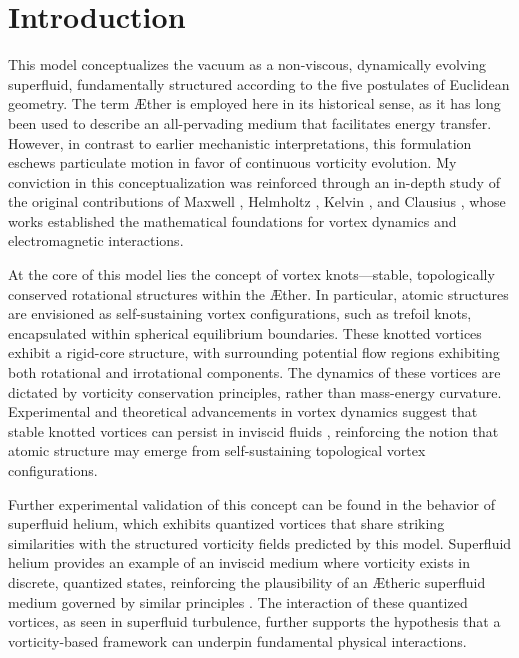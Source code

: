 \documentclass[a4paper,10pt]{article}
\begin{document}
    \section{Introduction}
    This model conceptualizes the vacuum as a non-viscous, dynamically evolving superfluid, fundamentally structured according to the five postulates of Euclidean geometry. The term Æther is employed here in its historical sense, as it has long been used to describe an all-pervading medium that facilitates energy transfer. However, in contrast to earlier mechanistic interpretations, this formulation eschews particulate motion in favor of continuous vorticity evolution. My conviction in this conceptualization was reinforced through an in-depth study of the original contributions of Maxwell \cite{maxwell1861}, Helmholtz \cite{helmholtz1858}, Kelvin \cite{kelvin1867}, and Clausius \cite{clausius1865}, whose works established the mathematical foundations for vortex dynamics and electromagnetic interactions.

    At the core of this model lies the concept of vortex knots—stable, topologically conserved rotational structures within the Æther. In particular, atomic structures are envisioned as self-sustaining vortex configurations, such as trefoil knots, encapsulated within spherical equilibrium boundaries. These knotted vortices exhibit a rigid-core structure, with surrounding potential flow regions exhibiting both rotational and irrotational components. The dynamics of these vortices are dictated by vorticity conservation principles, rather than mass-energy curvature. Experimental and theoretical advancements in vortex dynamics suggest that stable knotted vortices can persist in inviscid fluids \cite{kleckner2013}, reinforcing the notion that atomic structure may emerge from self-sustaining topological vortex configurations.

    Further experimental validation of this concept can be found in the behavior of superfluid helium, which exhibits quantized vortices that share striking similarities with the structured vorticity fields predicted by this model. Superfluid helium provides an example of an inviscid medium where vorticity exists in discrete, quantized states, reinforcing the plausibility of an Ætheric superfluid medium governed by similar principles \cite{vinen2002}. The interaction of these quantized vortices, as seen in superfluid turbulence, further supports the hypothesis that a vorticity-based framework can underpin fundamental physical interactions.
\end{document}
